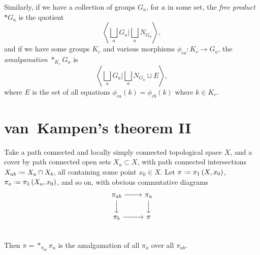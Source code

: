 Similarly, if we have a collection of groups \(G_a\), for \(a\) in some set, the \emph{free product} \(*G_a\) is the quotient 
\[
\left<\bigsqcup_a G_a|\bigsqcup_a N_{G_a}\right>,
\]
and if we have some groups \(K_c\) and various morphisms \(\phi_{ca} \colon K_c \to G_a\), the \emph{amalgamation} \(*_{K_c} G_a\) is
\[
\left<\bigsqcup_a G_a|\bigsqcup_a N_{G_a}\sqcup E\right>,
\]
where \(E\) is the set of all equations \(\phi_{ca}(k)=\phi_{cb}(k)\) where \(k \in K_c\).

\section{van~Kampen's theorem II}
\begin{theorem}\label{theorem:van.Kampen.II}
Take a path connected and locally simply connected topological space \(X\), and a cover by path connected open sets \(X_a \subset X\), with path connected intersections \(X_{ab} \defeq X_a \cap X_b\), all containing some point \(x_0 \in X\).
Let \(\pi\defeq\fundamentalGroup{X,x_0}\), \(\pi_a\defeq\fundamentalGroup{X_a,x_0}\), and so on, with obvious commutative diagrams
\[
\begin{tikzcd}
\pi_{ab} \arrow{r}{} \arrow{d}{} & \pi_a \arrow{d}{} \\
\pi_b \arrow{r}{}
& \pi \\
\end{tikzcd}
\]
Then
\(
\pi=*_{\pi_{bc}} \pi_a
\)
is the amalgamation of all \(\pi_a\) over all \(\pi_{ab}\).
\end{theorem}
